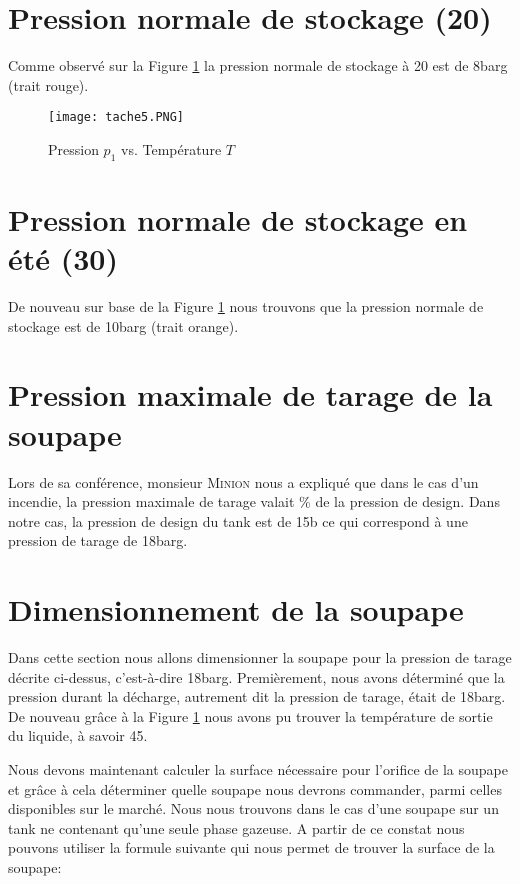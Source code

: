 
\section{Pression normale de stockage (\unit{20}{\celsius})}

Comme observé sur la Figure \ref{graph1} la pression normale de stockage à \unit{20}{\celsius} est de \unit{8}{barg} (trait rouge).

\begin{figure}[ht!]
\centering
\texttt{[image: tache5.PNG]}
\caption{Pression $p_1$ vs. Température $T$}
\label{graph1}
\end{figure}

\section{Pression normale de stockage en été (\unit{30}{\celsius})}

De nouveau sur base de la Figure \ref{graph1} nous trouvons que la pression normale de stockage est de \unit{10}{barg} (trait orange).

\section{Pression maximale de tarage de la soupape}

Lors de sa conférence, monsieur \textsc{Minion} nous a expliqué que dans le cas d'un incendie, la pression maximale de tarage valait  \% de la pression de design. Dans notre cas, la pression de design du tank est de \unit{15}{b} ce qui correspond à une pression de tarage de \unit{18}{barg}.

\section{Dimensionnement de la soupape}

Dans cette section nous allons dimensionner la soupape pour la pression de tarage décrite ci-dessus, c'est-à-dire \unit{18}{barg}.
Premièrement, nous avons déterminé que la pression durant la décharge, autrement dit la pression de tarage, était de \unit{18}{barg}. De nouveau grâce à la Figure \ref{graph1} nous avons pu trouver la température de sortie du liquide, à savoir \unit{45}{\celsius}.

Nous devons maintenant calculer la surface nécessaire pour l'orifice de la soupape et grâce à cela déterminer quelle soupape nous devrons commander, parmi celles disponibles sur le marché. Nous nous trouvons dans le cas d'une soupape sur un tank ne contenant qu'une seule phase gazeuse. A partir de ce constat nous pouvons utiliser la formule suivante qui nous permet de trouver la surface de la soupape:

